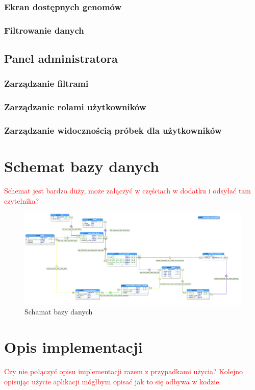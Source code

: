 \documentclass[a4paper,12pt,twoside]{article}
\begin{document}
\subsubsection{Ekran dostępnych genomów}
\subsubsection{Filtrowanie danych}

\subsection{Panel administratora}
\subsubsection{Zarządzanie filtrami}
\subsubsection{Zarządzanie rolami użytkowników}
\subsubsection{Zarządzanie widocznością próbek dla użytkowników}

\newpage
\section{Schemat bazy danych}
\textcolor{red}{
Schemat jest bardzo duży, może załączyć w częściach w dodatku i odsyłać tam czytelnika?
}
\begin{figure}[h!]
  \includegraphics[width=\linewidth]{obrazy/database.png}
  \caption{Schamat bazy danych}
  \label{fig:bazadanych}
\end{figure}

\newpage
\section{Opis implementacji}  
\textcolor{red}{
Czy nie połączyć opisu implementacji razem z przypadkami użycia?
Kolejno opisując użycie aplikacji mógłbym opisać jak to się odbywa w kodzie.
}
\newpage
\end{document}

